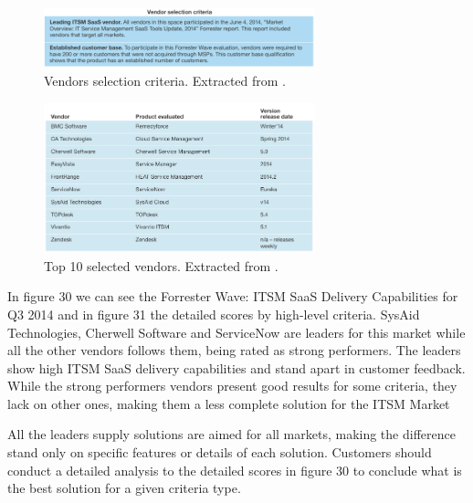 \begin{figure}[h!]
\centering
\includegraphics[width=0.7\textwidth]{img/VendorSelectionCriteriaITSM.png}
\caption{Vendors selection criteria. Extracted from \cite{forresterWaveITSM}.}
\end{figure}


\begin{figure}[h!]
\centering
\includegraphics[width=0.7\textwidth]{img/ITSMVendorsInfo.png}
\caption{Top 10 selected vendors. Extracted from \cite{forresterWaveITSM}.}
\end{figure}

In figure 30 we can see the Forrester Wave: ITSM SaaS Delivery Capabilities for Q3 2014 and in figure 31 the detailed scores by high-level criteria. SysAid Technologies, Cherwell Software and ServiceNow are leaders for this market while all the other vendors follows them, being rated as strong performers. The leaders show high ITSM SaaS delivery capabilities and stand apart in customer feedback. While the strong performers vendors present good results for some criteria, they lack on other ones, making them a less complete solution for the ITSM Market\par
All the leaders supply solutions are aimed for all markets, making the difference stand only on specific features or details of each solution. Customers should conduct a detailed analysis to the detailed scores in figure 30 to conclude what is the best solution for a given criteria type.\par


